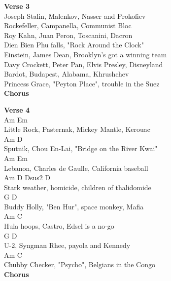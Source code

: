 \documentclass[a4paper]{article}
\begin{document}
{{        }
        \textbf{Verse 3}
        ~\\
        {
            \cutive
            \obeyspaces
Joseph Stalin, Malenkov, Nasser and Prokofiev
\\
Rockefeller, Campanella, Communist Bloc
\\
Roy Kahn, Juan Peron, Toscanini, Dacron
\\
Dien Bien Phu falls, "Rock Around the Clock"
\\
Einstein, James Dean, Brooklyn's got a winning team
\\
Davy Crockett, Peter Pan, Elvis Presley, Disneyland
\\
Bardot, Budapest, Alabama, Khrushchev
\\
Princess Grace, "Peyton Place", trouble in the Suez
\\

        }
        \textbf{Chorus}
        ~\\
        {
            \cutive
            \obeyspaces

        }
        \textbf{Verse 4}
        ~\\
        {
            \cutive
            \obeyspaces
Am                      Em
\\
Little Rock, Pasternak, Mickey Mantle, Kerouac
\\
Am                     D
\\
Sputnik, Chou En-Lai, "Bridge on the River Kwai"
\\
Am                          Em
\\
Lebanon, Charles de Gaulle, California baseball
\\
Am                       D                      Dsus2 D
\\
Stark weather, homicide, children of thalidomide 
\\
G                       D
\\
Buddy Holly, "Ben Hur", space monkey, Mafia
\\
Am                  C
\\
Hula hoops, Castro, Edsel is a no-go
\\
G                  D
\\
U-2, Syngman Rhee, payola and Kennedy
\\
Am                        C
\\
Chubby Checker, "Psycho", Belgians in the Congo
\\

        }
        \textbf{Chorus}
        ~\\
        {
            \cutive
            \obeyspaces

}}
\end{document}

